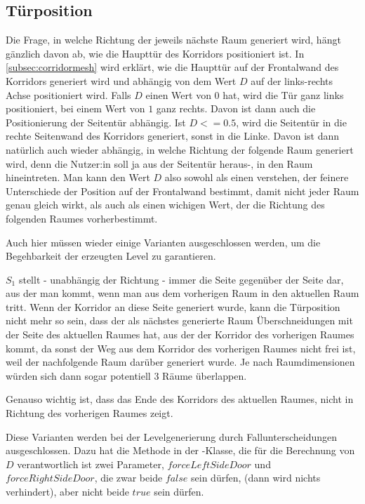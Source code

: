 \subsection{Türposition}
Die Frage, in welche Richtung der jeweils nächste Raum generiert wird, hängt gänzlich davon ab, wie die Haupttür des Korridors positioniert ist. In \autoref{subsec:corridormesh} wird erklärt, wie die Haupttür auf der Frontalwand des Korridors generiert wird und abhängig von dem Wert $D$ auf der links-rechts Achse positioniert wird.
Falls $D$ einen Wert von $0$ hat, wird die Tür ganz links positioniert, bei einem Wert von $1$ ganz rechts. Davon ist dann auch die Positionierung der Seitentür abhängig. Ist $D <= 0.5$, wird die Seitentür in die rechte Seitenwand des Korridors generiert, sonst in die Linke.
Davon ist dann natürlich auch wieder abhängig, in welche Richtung der folgende Raum generiert wird, denn die Nutzer:in soll ja aus der Seitentür heraus-, in den Raum hineintreten.
Man kann den Wert $D$ also sowohl als einen verstehen, der feinere Unterschiede
der Position auf der Frontalwand bestimmt, damit nicht jeder Raum genau gleich wirkt, als auch als einen wichigen Wert, der die Richtung des folgenden Raumes vorherbestimmt.

Auch hier müssen wieder einige Varianten ausgeschlossen werden, um die Begehbarkeit der erzeugten Level zu garantieren.

$S_1$ stellt - unabhängig der Richtung - immer die Seite gegenüber der Seite dar, aus der man kommt, wenn man aus dem vorherigen Raum in den aktuellen Raum tritt.
Wenn der Korridor an diese Seite generiert wurde, kann die Türposition nicht mehr so sein, dass der als nächstes generierte Raum Überschneidungen mit der Seite des aktuellen Raumes hat, aus der der Korridor des vorherigen Raumes kommt, da sonst der Weg aus dem Korridor des vorherigen Raumes nicht frei ist, weil der nachfolgende Raum darüber generiert wurde. Je nach Raumdimensionen würden sich dann sogar potentiell 3 Räume überlappen.

Genauso wichtig ist, dass das Ende des Korridors des aktuellen Raumes, nicht in Richtung des vorherigen Raumes zeigt.

Diese Varianten werden bei der Levelgenerierung durch Fallunterscheidungen ausgeschlossen. %
Dazu hat die Methode  in der -Klasse, die für die Berechnung von $D$ verantwortlich ist zwei Parameter, $forceLeftSideDoor$ und $forceRightSideDoor$, die zwar beide $false$ sein dürfen, (dann wird nichts verhindert), aber nicht beide $true$ sein dürfen.

